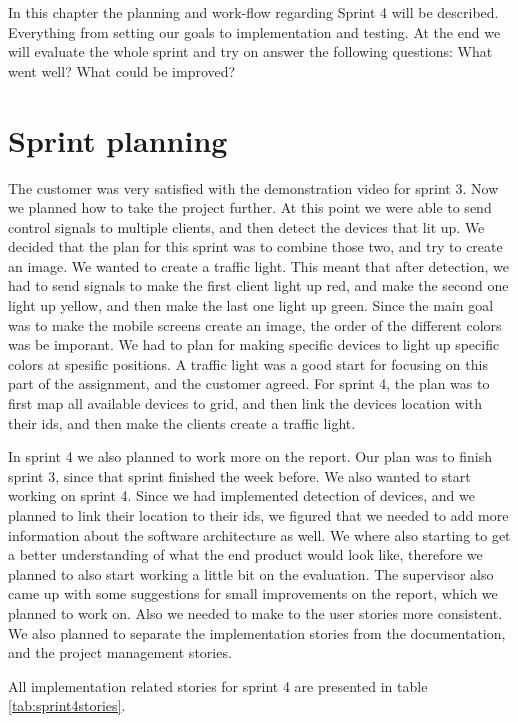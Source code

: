 In this chapter the planning and work-flow regarding Sprint 4 will be described. 
Everything from setting our goals to implementation and testing. At the end we will evaluate the whole sprint and try on answer the following questions: What went well? What could be improved? 
\section{Sprint planning}

The customer was very satisfied with the demonstration video for sprint 3. Now we planned how to take the project further. At this point we were able to send control signals to multiple clients, and then detect the devices that lit up. We decided that the plan for this sprint was to combine those two, and try to create an image. We wanted to create a traffic light. This meant that after detection, we had to send signals to make the first client light up red, and make the second one light up yellow, and then make the last one light up green. Since the main goal was to make the mobile screens create an image, the order of the different colors was be imporant. We had to plan for making specific devices to light up specific colors at spesific positions. A traffic light was a good start for focusing on this part of the assignment, and the customer agreed. For sprint 4, the plan was to first map all available devices to grid, and then link the devices location with their ids, and then make the clients create a traffic light.  


In sprint 4 we also planned to work more on the report. Our plan was to finish sprint 3, since that sprint finished the week before. We also wanted to start working on sprint 4. Since we had implemented detection of devices, and we planned to link their location to their ids, we figured that we needed to add more information about the software architecture as well. We where also starting to get a better understanding of what the end product would look like, therefore we planned to also start working a little bit on the evaluation. The supervisor also came up with some suggestions for small improvements on the report, which we planned to work on. Also we needed to make to the user stories more consistent. We also planned to separate the implementation stories from the documentation, and the project management stories.


All implementation related stories for sprint 4 are presented in table \ref{tab:sprint4stories}.


